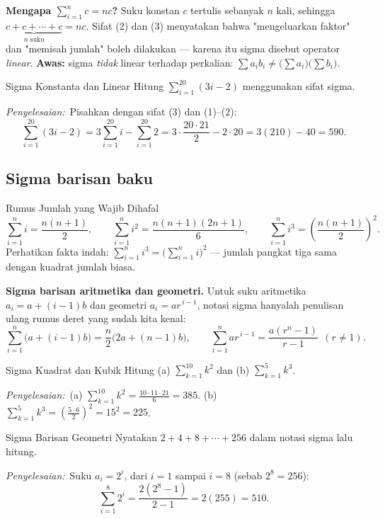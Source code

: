 \documentclass[11pt,a4paper]{report}
\theoremstyle{gaya}
\newcommand{\jawab}{\par\smallskip\noindent\textit{\textcolor{oranye}{Penyelesaian:}}\ }
\begin{document}
\textbf{Mengapa $\sum_{i=1}^n c=nc$?} Suku konstan $c$ tertulis sebanyak $n$ kali, sehingga $\underbrace{c+c+\cdots+c}_{n\text{ suku}}=nc$. Sifat (2) dan (3) menyatakan bahwa "mengeluarkan faktor" dan "memisah jumlah" boleh dilakukan --- karena itu sigma disebut operator \emph{linear}. \textbf{Awas:} sigma \emph{tidak} linear terhadap perkalian: $\sum a_i b_i \neq \big(\sum a_i\big)\big(\sum b_i\big)$.

\begin{contoh}{Sigma Konstanta dan Linear}
Hitung $\displaystyle\sum_{i=1}^{20}(3i-2)$ menggunakan sifat sigma.

\jawab Pisahkan dengan sifat (3) dan (1)--(2):
\[
\sum_{i=1}^{20}(3i-2)=3\sum_{i=1}^{20} i-\sum_{i=1}^{20}2
=3\cdot\frac{20\cdot21}{2}-2\cdot20=3(210)-40=590.
\]
\end{contoh}

\subsection*{Sigma barisan baku}
\begin{konsep}{Rumus Jumlah yang Wajib Dihafal}
\[
\sum_{i=1}^{n} i = \frac{n(n+1)}{2},\qquad
\sum_{i=1}^{n} i^2 = \frac{n(n+1)(2n+1)}{6},\qquad
\sum_{i=1}^{n} i^3 = \left(\frac{n(n+1)}{2}\right)^{\!2}.
\]
Perhatikan fakta indah: $\displaystyle\sum_{i=1}^{n} i^3=\Big(\sum_{i=1}^{n} i\Big)^2$ --- jumlah pangkat tiga sama dengan kuadrat jumlah biasa.
\end{konsep}

\textbf{Sigma barisan aritmetika dan geometri.} Untuk suku aritmetika $a_i=a+(i-1)b$ dan geometri $a_i=ar^{\,i-1}$, notasi sigma hanyalah penulisan ulang rumus deret yang sudah kita kenal:
\[
\sum_{i=1}^{n}\big(a+(i-1)b\big)=\frac n2\big(2a+(n-1)b\big),\qquad
\sum_{i=1}^{n}ar^{\,i-1}=\frac{a(r^{n}-1)}{r-1}\ \ (r\neq1).
\]

\begin{contoh}{Sigma Kuadrat dan Kubik}
Hitung (a) $\displaystyle\sum_{k=1}^{10}k^2$ dan (b) $\displaystyle\sum_{k=1}^{5}k^3$.

\jawab (a) $\displaystyle\sum_{k=1}^{10}k^2=\frac{10\cdot11\cdot21}{6}=385$.\quad
(b) $\displaystyle\sum_{k=1}^{5}k^3=\left(\frac{5\cdot6}{2}\right)^2=15^2=225$.
\end{contoh}

\begin{contoh}{Sigma Barisan Geometri}
Nyatakan $2+4+8+\cdots+256$ dalam notasi sigma lalu hitung.

\jawab Suku $a_i=2^i$, dari $i=1$ sampai $i=8$ (sebab $2^8=256$):
\[
\sum_{i=1}^{8}2^i=\frac{2(2^8-1)}{2-1}=2(255)=510.
\]
\end{contoh}
\end{document}
